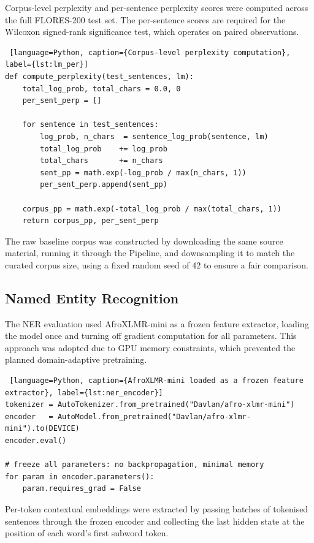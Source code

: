 \documentclass[12pt]{ThesisRU}
\begin{document}
Corpus-level perplexity and per-sentence perplexity scores were computed across the full FLORES-200 test set. The per-sentence scores are required for the Wilcoxon signed-rank significance test, which operates on paired observations.

\begin{lstlisting} [language=Python, caption={Corpus-level perplexity computation}, label={lst:lm_per}]
def compute_perplexity(test_sentences, lm):
    total_log_prob, total_chars = 0.0, 0
    per_sent_perp = []
 
    for sentence in test_sentences:
        log_prob, n_chars  = sentence_log_prob(sentence, lm)
        total_log_prob    += log_prob
        total_chars       += n_chars
        sent_pp = math.exp(-log_prob / max(n_chars, 1))
        per_sent_perp.append(sent_pp)
 
    corpus_pp = math.exp(-total_log_prob / max(total_chars, 1))
    return corpus_pp, per_sent_perp
\end{lstlisting}

The raw baseline corpus was constructed by downloading the same source material, running it through the Pipeline, and downsampling it to match the curated corpus size, using a fixed random seed of 42 to ensure a fair comparison.

\subsection{Named Entity Recognition}
The NER evaluation used AfroXLMR-mini \citep{alabi-etal-2022-adapting} as a frozen feature extractor, loading the model once and turning off gradient computation for all parameters. This approach was adopted due to GPU memory constraints, which prevented the planned domain-adaptive pretraining.

\begin{lstlisting} [language=Python, caption={AfroXLMR-mini loaded as a frozen feature extractor}, label={lst:ner_encoder}]
tokenizer = AutoTokenizer.from_pretrained("Davlan/afro-xlmr-mini")
encoder   = AutoModel.from_pretrained("Davlan/afro-xlmr-mini").to(DEVICE)
encoder.eval()
 
# freeze all parameters: no backpropagation, minimal memory
for param in encoder.parameters():
    param.requires_grad = False
\end{lstlisting}

Per-token contextual embeddings were extracted by passing batches of tokenised sentences through the frozen encoder and collecting the last hidden state at the position of each word's first subword token.
\end{document}
